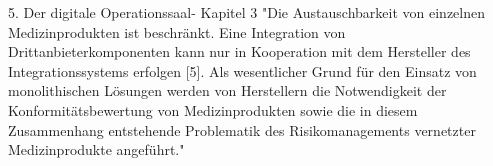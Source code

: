 5. Der digitale Operationssaal- Kapitel 3
"Die Austauschbarkeit
von einzelnen Medizinprodukten ist beschränkt. Eine Integration von Drittanbieterkomponenten
kann nur in Kooperation mit dem Hersteller des Integrationssystems
erfolgen [5]. Als wesentlicher Grund für den Einsatz von monolithischen Lösungen
werden von Herstellern die Notwendigkeit der Konformitätsbewertung von Medizinprodukten
sowie die in diesem Zusammenhang entstehende Problematik des Risikomanagements
vernetzter Medizinprodukte angeführt."



	



	
